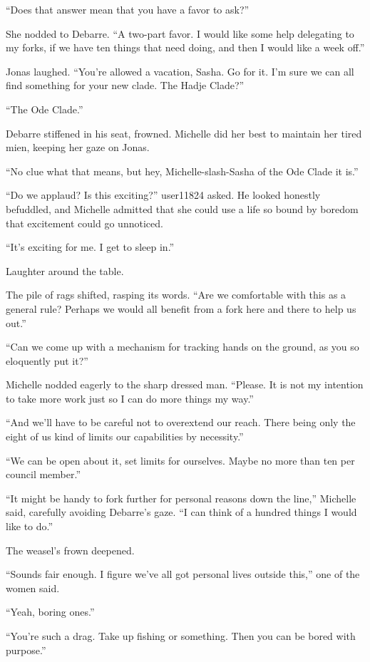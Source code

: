 ``Does that answer mean that you have a favor to ask?''

She nodded to Debarre. ``A two-part favor. I would like some help delegating to my forks, if we have ten things that need doing, and then I would like a week off.''

Jonas laughed. ``You're allowed a vacation, Sasha. Go for it. I'm sure we can all find something for your new clade. The Hadje Clade?''

``The Ode Clade.''

Debarre stiffened in his seat, frowned. Michelle did her best to maintain her tired mien, keeping her gaze on Jonas.

``No clue what that means, but hey, Michelle-slash-Sasha of the Ode Clade it is.''

``Do we applaud? Is this exciting?'' user11824 asked. He looked honestly befuddled, and Michelle admitted that she could use a life so bound by boredom that excitement could go unnoticed.

``It's exciting for me. I get to sleep in.''

Laughter around the table.

The pile of rags shifted, rasping its words. ``Are we comfortable with this as a general rule? Perhaps we would all benefit from a fork here and there to help us out.''

``Can we come up with a mechanism for tracking hands on the ground, as you so eloquently put it?''

Michelle nodded eagerly to the sharp dressed man. ``Please. It is not my intention to take more work just so I can do more things my way.''

``And we'll have to be careful not to overextend our reach. There being only the eight of us kind of limits our capabilities by necessity.''

``We can be open about it, set limits for ourselves. Maybe no more than ten per council member.''

``It might be handy to fork further for personal reasons down the line,'' Michelle said, carefully avoiding Debarre's gaze. ``I can think of a hundred things I would like to do.''

The weasel's frown deepened.

``Sounds fair enough. I figure we've all got personal lives outside this,'' one of the women said.

``Yeah, boring ones.''

``You're such a drag. Take up fishing or something. Then you can be bored with purpose.''

